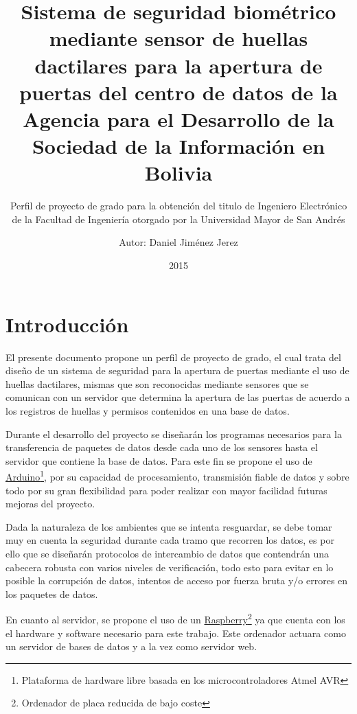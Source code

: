 \documentclass[12pt, letterpaper]{scrartcl}
\begin{document}
	\title{Sistema de seguridad biométrico mediante sensor de huellas dactilares para la apertura de puertas del centro de datos de la Agencia para el Desarrollo de la Sociedad de la Información en Bolivia\vspace{2em}}
	\subtitle{Perfil de proyecto de grado para la obtención del titulo de Ingeniero Electrónico de la Facultad de Ingeniería otorgado por la Universidad Mayor de San Andrés\vspace{4em}}
	\author{Autor: Daniel Jiménez Jerez\vspace{6em}}
	\date{2015}
	\maketitle
	\newpage
	\tableofcontents
	\newpage
	
	\section{Introducción}
	El presente documento propone un perfil de proyecto de grado, el cual trata del diseño de un sistema de seguridad para la apertura de puertas mediante el uso de huellas dactilares, mismas que son reconocidas mediante sensores que se comunican con un servidor que determina la apertura de las puertas de acuerdo a los registros de huellas y permisos contenidos en una base de datos.
	
	Durante el desarrollo del proyecto se diseñarán los programas necesarios para la transferencia de paquetes de datos desde cada uno de los sensores hasta el servidor que contiene la base de datos. Para este fin se propone el uso de \href{http://www.arduino.cc/}{Arduino}\footnote{Plataforma de hardware libre basada en los microcontroladores Atmel AVR}, por su capacidad de procesamiento, transmisión fiable de datos y sobre todo por su gran flexibilidad para poder realizar con mayor facilidad futuras mejoras del proyecto.
	
	Dada la naturaleza de los ambientes que se intenta resguardar, se debe tomar muy en cuenta la seguridad durante cada tramo que recorren los datos, es por ello que se diseñarán protocolos de intercambio de datos que contendrán una cabecera robusta con varios niveles de verificación, todo esto para evitar en lo posible la corrupción de datos, intentos de acceso por fuerza bruta y/o errores en los paquetes de datos.
	
	En cuanto al servidor, se propone el uso de un  \href{http://www.raspberrypi.org/}{Raspberry}\footnote{Ordenador de placa reducida de bajo coste} ya que cuenta con los el hardware y software necesario para este trabajo. Este ordenador actuara como un servidor de bases de datos y a la vez como servidor web.
	
\end{document}
